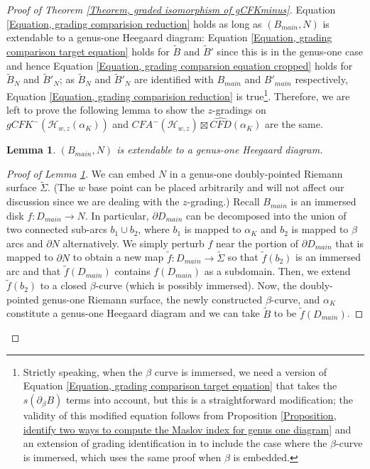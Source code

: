 \documentclass{amsart}
\newtheorem{lem}[thm]{Lemma}
\theoremstyle{definition}
\theoremstyle{remark}
\numberwithin{equation}{section}
\numberwithin{equation}{section} \makeatletter
\begin{document}
\begin{proof}[Proof of Theorem \ref{Theorem, graded isomorphism of gCFKminus}]
 Equation \ref{Equation, grading comparision reduction} holds as long as $(B_{main}, N)$ is extendable to a genus-one Heegaard diagram: Equation \ref{Equation, grading comparison target equation} holds for $\tilde{B}$ and $\tilde{B}'$ since this is in the genus-one case and hence Equation \ref{Equation, grading comparsion equation cropped} holds for $\tilde{B}_N$ and $\tilde{B}'_N$; as $\tilde{B}_N$ and $\tilde{B}'_N$ are identified with $B_{main}$ and $B'_{main}$ respectively, Equation \ref{Equation, grading comparision reduction} is true\footnote{Strictly speaking, when the $\beta$ curve is immersed, we need a version of Equation \ref{Equation, grading comparison target equation} that takes the $s(\partial_\beta B)$ terms into account, but this is a straightforward modification; the validity of this modified equation follows from Proposition \ref{Proposition, identify two ways to compute the Maslov index for genus one diagram} and an extension of grading identification in \cite{Chen2019} to include the case where the $\beta$-curve is immersed, which uses the same proof when $\beta$ is embedded.}. Therefore, we are left to prove the following lemma to show the $z$-gradings on $gCFK^-(\mathcal{H}_{w,z}(\alpha_{K}))$ and ${CFA}^-(\mathcal{H}_{w,z})\boxtimes \widehat{CFD}(\alpha_K)$ are the same.  

\begin{lem}\label{Lemma, extending B main}
$(B_{main},N)$ is extendable to a genus-one Heegaard diagram.
\end{lem}
\begin{proof}[Proof of Lemma \ref{Lemma, extending B main}]
We can embed $N$ in a genus-one doubly-pointed Riemann surface $\widetilde{\Sigma}$. (The $w$ base point can be placed arbitrarily and will not affect our discussion since we are dealing with the $z$-grading.) Recall $B_{main}$ is an immersed disk $f:D_{main}\rightarrow N$. In particular, $\partial D_{main}$ can be decomposed into the union of two connected sub-arcs $b_1\cup b_2$, where $b_1$ is mapped to $\alpha_K$ and $b_2$ is mapped to $\beta$ arcs and $\partial N$ alternatively. We simply perturb $f$ near the portion of $\partial D_{main}$ that is mapped to $\partial N$ to obtain a new map $\tilde{f}: D_{main}\rightarrow \widetilde{\Sigma}$ so that $\tilde{f}({b_2})$ is an immersed arc and that $\tilde{f}(D_{main})$ contains $f(D_{main})$ as a subdomain. Then, we extend $\tilde{f}({b_2})$ to a closed $\beta$-curve (which is possibly immersed). Now, the doubly-pointed genus-one Riemann surface, the newly constructed $\beta$-curve, and $\alpha_{K}$ constitute a genus-one Heegaard diagram and we can take $\tilde{B}$ to be $\tilde{f}(D_{main})$.    
\end{proof}


\end{proof}
\end{document}
